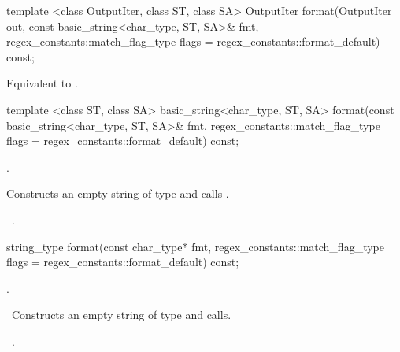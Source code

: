 %
%
\begin{itemdecl}
template <class OutputIter, class ST, class SA>
  OutputIter format(OutputIter out,
                    const basic_string<char_type, ST, SA>& fmt,
                    regex_constants::match_flag_type flags =
                      regex_constants::format_default) const;
\end{itemdecl}

\begin{itemdescr}
\pnum
\effects Equivalent to 
.
\end{itemdescr}

%
%
\begin{itemdecl}
template <class ST, class SA>
  basic_string<char_type, ST, SA>
  format(const basic_string<char_type, ST, SA>& fmt,
         regex_constants::match_flag_type flags =
           regex_constants::format_default) const;
\end{itemdecl}

\begin{itemdescr}
\pnum
\requires {}.

\pnum
\effects
Constructs an empty string  of type  and
calls .

\pnum
\returns\ .
\end{itemdescr}

%
%
\begin{itemdecl}
string_type
  format(const char_type* fmt,
         regex_constants::match_flag_type flags =
           regex_constants::format_default) const;
\end{itemdecl}

\begin{itemdescr}
\pnum
\requires {}.

\pnum
\effects\ Constructs an empty string  of type  and
calls\linebreak {}.

\pnum
\returns\ .
\end{itemdescr}

